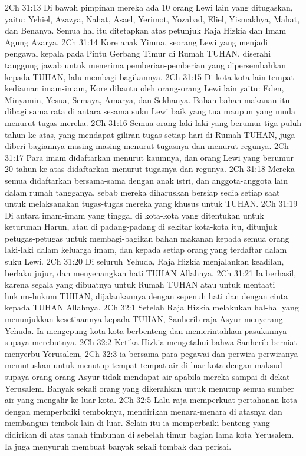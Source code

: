 2Ch 31:13  Di bawah pimpinan mereka ada 10 orang Lewi lain yang ditugaskan, yaitu: Yehiel, Azazya, Nahat, Asael, Yerimot, Yozabad, Eliel, Yismakhya, Mahat, dan Benanya. Semua hal itu ditetapkan atas petunjuk Raja Hizkia dan Imam Agung Azarya.
2Ch 31:14  Kore anak Yimna, seorang Lewi yang menjadi pengawal kepala pada Pintu Gerbang Timur di Rumah TUHAN, diserahi tanggung jawab untuk menerima pemberian-pemberian yang dipersembahkan kepada TUHAN, lalu membagi-bagikannya.
2Ch 31:15  Di kota-kota lain tempat kediaman imam-imam, Kore dibantu oleh orang-orang Lewi lain yaitu: Eden, Minyamin, Yesua, Semaya, Amarya, dan Sekhanya. Bahan-bahan makanan itu dibagi sama rata di antara sesama suku Lewi baik yang tua maupun yang muda menurut tugas mereka.
2Ch 31:16  Semua orang laki-laki yang berumur tiga puluh tahun ke atas, yang mendapat giliran tugas setiap hari di Rumah TUHAN, juga diberi bagiannya masing-masing menurut tugasnya dan menurut regunya.
2Ch 31:17  Para imam didaftarkan menurut kaumnya, dan orang Lewi yang berumur 20 tahun ke atas didaftarkan menurut tugasnya dan regunya.
2Ch 31:18  Mereka semua didaftarkan bersama-sama dengan anak istri, dan anggota-anggota lain dalam rumah tangganya, sebab mereka diharuskan bersiap sedia setiap saat untuk melaksanakan tugas-tugas mereka yang khusus untuk TUHAN.
2Ch 31:19  Di antara imam-imam yang tinggal di kota-kota yang ditentukan untuk keturunan Harun, atau di padang-padang di sekitar kota-kota itu, ditunjuk petugas-petugas untuk membagi-bagikan bahan makanan kepada semua orang laki-laki dalam keluarga imam, dan kepada setiap orang yang terdaftar dalam suku Lewi.
2Ch 31:20  Di seluruh Yehuda, Raja Hizkia menjalankan keadilan, berlaku jujur, dan menyenangkan hati TUHAN Allahnya.
2Ch 31:21  Ia berhasil, karena segala yang dibuatnya untuk Rumah TUHAN atau untuk mentaati hukum-hukum TUHAN, dijalankannya dengan sepenuh hati dan dengan cinta kepada TUHAN Allahnya.
2Ch 32:1  Setelah Raja Hizkia melakukan hal-hal yang menunjukkan kesetiaannya kepada TUHAN, Sanherib raja Asyur menyerang Yehuda. Ia mengepung kota-kota berbenteng dan memerintahkan pasukannya supaya merebutnya.
2Ch 32:2  Ketika Hizkia mengetahui bahwa Sanherib berniat menyerbu Yerusalem,
2Ch 32:3  ia bersama para pegawai dan perwira-perwiranya memutuskan untuk menutup tempat-tempat air di luar kota dengan maksud supaya orang-orang Asyur tidak mendapat air apabila mereka sampai di dekat Yerusalem. Banyak sekali orang yang dikerahkan untuk menutup semua sumber air yang mengalir ke luar kota.
2Ch 32:5  Lalu raja memperkuat pertahanan kota dengan memperbaiki temboknya, mendirikan menara-menara di atasnya dan membangun tembok lain di luar. Selain itu ia memperbaiki benteng yang didirikan di atas tanah timbunan di sebelah timur bagian lama kota Yerusalem. Ia juga menyuruh membuat banyak sekali tombak dan perisai.
